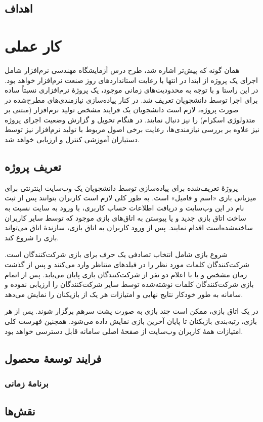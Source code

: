 \documentclass[a4paper,notitlepage]{report}
\begin{document}
\section{اهداف}
\chapter{کار عملی}
همان گونه که پیش‌تر اشاره شد، طرح درس آزمایشگاه مهندسی نرم‌افزار شامل اجرای یک پروژه از ابتدا در انتها با رعایت استانداردهای روز صنعت نرم‌افزار خواهد بود.
در این راستا و با توجه به محدودیت‌های زمانی موجود، یک پروژهٔ نرم‌افزاری نسبتاً ساده برای اجرا توسط دانشجویان تعریف شد.
در کنار پیاده‌سازی نیازمندی‌های مطرح‌شده در صورت پروژه، لازم است دانشجویان یک فرایند مشخص تولید نرم‌افزار (مبتنی بر متدولوژی اسکرام) را نیز دنبال نمایند.
در هنگام تحویل و گزارش وضعیت اجرای پروژه نیز علاوه بر بررسی نیازمندی‌ها، رعایت برخی اصول مربوط با تولید نرم‌افزار نیز توسط دستیاران آموزشی کنترل و ارزیابی خواهد شد.
\section{تعریف پروژه}
پروژهٔ تعریف‌شده برای پیاده‌سازی توسط دانشجویان یک وب‌سایت اینترنتی برای میزبانی بازی «اسم و فامیل» است.
به طور کلی لازم است کاربران بتوانند پس از ثبت نام در این وب‌سایت و دریافت اطلاعات حساب کاربری، با ورود به سایت
نسبت به ساخت اتاق بازی جدید و یا پیوستن به اتاق‌های بازی موجود که توسط سایر کاربران ساخته‌شده‌است اقدام نمایند.
پس از ورود کاربران به اتاق بازی، سازندهٔ اتاق می‌تواند بازی را شروع کند.

شروع بازی شامل انتخاب تصادفی یک حرف برای بازی شرکت‌کنندگان است.
شرکت‌کنندگان کلمات مورد نظر را در فیلدهای متناظر وارد می‌کنند و پس از گذشت زمان مشخص و یا با اعلام دو نفر از شرکت‌کنندگان بازی پایان می‌یابد.
پس از اتمام بازی شرکت‌کنندگان کلمات نوشته‌شده توسط سایر شرکت‌کنندگان را ارزیابی نموده و سامانه به طور خودکار نتایج نهایی و امتیازات هر یک از بازیکنان را نمایش می‌دهد.

در یک اتاق بازی، ممکن است چند بازی به صورت پشت سرهم برگزار شوند.
پس از هر بازی، رتبه‌بندی بازیکنان تا پایان آخرین بازی نمایش داده می‌شود.
همچنین فهرست کلی امتیازات همهٔ کاربران وب‌سایت از صفحهٔ اصلی سامانه قابل دسترسی خواهد بود.
\section{فرایند توسعهٔ محصول}
\subsection{برنامهٔ زمانی}
\section{نقش‌ها}
\end{document}
